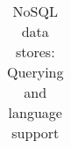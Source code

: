 \begin{landscape}
\begin{table}
\begin{tabular}{l l l l l l l l l}
      \bottomrule
    \end{tabular}

    \caption{NoSQL data stores: Querying and language support}
    \label{tbl:query-language}
  \end{table}

\end{landscape}
